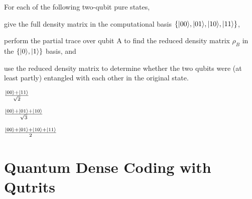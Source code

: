 \documentclass{../phys084}
\begin{document}
\begin {exercise}
  For each of the following two-qubit pure states,
  \begin {enumerate*} [label=(\roman*)]
  \item give the full density matrix in the computational basis
    \(\{\lvert00\rangle,\lvert01\rangle,\lvert10\rangle,\lvert11\rangle\}\),
  \item perform the
    partial trace over qubit A to find the reduced density matrix
    \(\rho_B\) in the \(\{\lvert0\rangle,\lvert1\rangle\}\) basis, and
  \item use the
    reduced density matrix to determine whether the two qubits were
    (at least partly) entangled with each other in the original state.
  \end {enumerate*}
  \begin {problems}
  \item \(\frac {\lvert00\rangle + \lvert11\rangle} {\sqrt 2}\)
  \item \(\frac {\lvert00\rangle + \lvert01\rangle + \lvert10\rangle} {\sqrt 3}\)
  \item \(\frac {\lvert00\rangle + \lvert01\rangle + \lvert10\rangle + \lvert11\rangle} 2\)
  \end {problems}
\end {exercise}

\begin {solution}
  \begin {problems}
  \item
  \item
  \item
  \end {problems}
\end {solution}

\section{Quantum Dense Coding with Qutrits}
\end{document}
